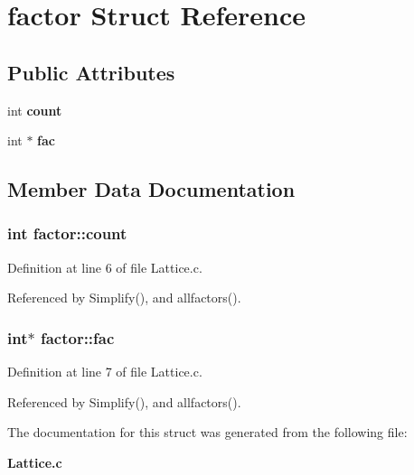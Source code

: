 \section{factor  Struct Reference}
\label{structfactor}
\subsection*{Public Attributes}
\begin{CompactItemize}
\item 
int {\bf count}
\item 
int $\ast$ {\bf fac}
\end{CompactItemize}


\subsection{Member Data Documentation}
\subsubsection{\setlength{\rightskip}{0pt plus 5cm}int factor::count}\label{structfactor_m0}




Definition at line 6 of file Lattice.c.

Referenced by Simplify(), and allfactors().

\subsubsection{\setlength{\rightskip}{0pt plus 5cm}int$\ast$ factor::fac}\label{structfactor_m1}




Definition at line 7 of file Lattice.c.

Referenced by Simplify(), and allfactors().



The documentation for this struct was generated from the following file:\begin{CompactItemize}
\item 
{\bf Lattice.c}\end{CompactItemize}
